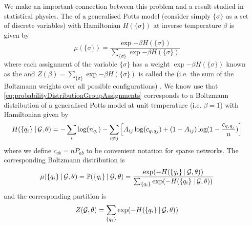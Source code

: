 We make an important connection between this problem and a result studied in statistical physics.
The  of a generalised Potts model (consider simply $\{ \sigma \}$ as a set of discrete variables) with Hamiltonian $H(\{ \sigma \})$ at inverse temperature $\beta$ is given by
\begin{equation}
	\label{eq:boltzmannDistributionPottsModel}
	\mu(\{ \sigma \}) = \frac{\exp{- \beta H(\{ \sigma \})}}{\sum_{\{ \sigma \}} \exp{- \beta H(\{ \sigma \})}}
\end{equation}
where each assignment of the variable $\{ \sigma \}$ has a weight $\exp{- \beta H(\{ \sigma \})}$ known as the  and $Z(\beta) = \sum_{\{ \sigma \}} \exp{- \beta H(\{ \sigma \})}$ is called the  (i.e. the sum of the Boltzmann weights over all possible configurations) \cite{Pru14a,Pru14b,Sus}.
We know use that \cref{eq:probabilityDistributionGroupAssignments} corresponds to a Boltzmann distribution of a generalised Potts model at unit temperature (i.e. $\beta = 1$) with Hamiltonian given by
\begin{equation}
	\label{eq:hamiltonianDistributionGroupAssignments}
	H(\{ q_{i} \} \:\lvert\: \mathcal G, \theta) = - \sum_{i} \log(n_{q_{i}}) - \sum_{i \neq j} \left[ A_{ij} \log(c_{q_{i}q_{j}}) + (1-A_{ij}) \log(1 - \frac{c_{q_{i}q_{j}}}{n}) \right]
\end{equation}
where we define $c_{ab} = n P_{ab}$ to be convenient notation for sparse networks.
The corresponding Boltzmann distribution is
\begin{equation}
	\label{eq:boltzmannDistributionGroupAssignments}
	\mu(\{q_{i}\} \given \graphvar{G}, \theta) = \probability{\{q_{i}\} \given \graphvar{G},\theta}  = \frac{\exp{- H(\{q_{i}\} \given \graphvar{G}, \theta)}}{\sum_{\{q_{i}\}} \exp{- H(\{q_{i}\} \given \graphvar{G}, \theta)}}
\end{equation}
and the corresponding partition is
\begin{equation}
	\label{eq:partitionFunctionGroupAssignments}
	Z(\graphvar{G}, \theta) = \sum_{\{q_{i}\}} \exp{- H(\{q_{i}\} \given \graphvar{G}, \theta)}
\end{equation}

